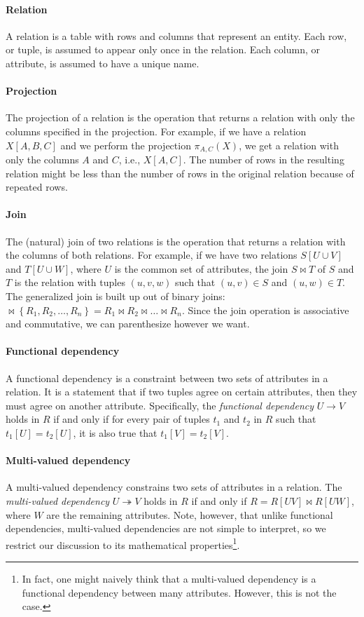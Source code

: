 \paragraph{Relation}  A relation is a table with rows and columns that represent
an entity.  Each row, or tuple, is assumed to appear only once in the relation.  Each
column, or attribute, is assumed to have a unique name.

\paragraph{Projection}  The projection of a relation is the operation that returns a
relation with only the columns specified in the projection.  For example, if we have a
relation $X[A, B, C]$ and we perform the projection $\pi_{A, C}(X)$, we get a
relation with only the columns $A$ and $C$, i.e., $X[A, C]$.  The number of rows
in the resulting relation might be less than the number of rows in the original relation
because of repeated rows.

\paragraph{Join}  The (natural) join of two relations is the operation that returns a
relation with the columns of both relations.  For example, if we have two relations $S[U
\cup V]$ and $T[U \cup W]$, where $U$ is the common set of attributes, the join $S \bowtie T$
of $S$ and $T$ is the relation with tuples $(u, v, w)$ such that $(u, v) \in S$ and $(u,
w) \in T$.  The generalized join is built up out of binary joins:  $\bowtie \left\{ R_1,
R_2, \dots, R_n \right\} = R_1 \bowtie R_2 \bowtie \dots \bowtie R_n$. Since the join
operation is associative and commutative, we can parenthesize however we want.

\paragraph{Functional dependency}  A functional dependency is a constraint between two
sets of attributes in a relation.  It is a statement that if two tuples agree on certain
attributes, then they must agree on another attribute.  Specifically, the \emph{functional
dependency} $U \to V$ holds in $R$ if and only if for every pair of tuples $t_1$ and $t_2$
in $R$ such that $t_1[U] = t_2[U]$, it is also true that $t_1[V] = t_2[V]$.

\paragraph{Multi-valued dependency}  A multi-valued dependency constrains
two sets of attributes in a relation.  The
\emph{multi-valued dependency} $U \twoheadrightarrow V$ holds in $R$ if and only if $R =
R[UV] \bowtie R[UW]$, where $W$ are the remaining attributes.  Note, however, that unlike
functional dependencies, multi-valued dependencies are not simple to interpret, so we
restrict our discussion to its mathematical properties\footnote{In fact, one might
naively think that a multi-valued dependency is a functional dependency between
many attributes.  However, this is not the case.}.

